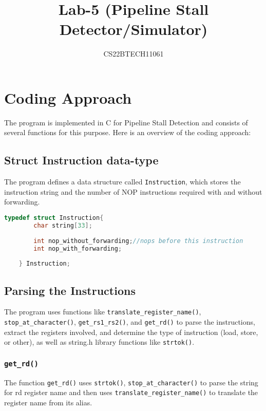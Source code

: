 \documentclass{article}
\title{Lab-5 (Pipeline Stall Detector/Simulator)}
\author{CS22BTECH11061}
\begin{document}
\maketitle

\section{Coding Approach}
The program is implemented in C for Pipeline Stall Detection and consists of several functions for this purpose. Here is an overview of the coding approach:

\subsection{Struct Instruction data-type}
The program defines a data structure called \texttt{Instruction}, which stores the instruction string and the number of NOP instructions required with and without forwarding.

\begin{lstlisting}[language=C, caption={struct Instruction}, label={code-get-rd}, backgroundcolor=\color{codebackground}]
    typedef struct Instruction{
        char string[33];
        
        int nop_without_forwarding;//nops before this instruction
        int nop_with_forwarding;
    
    } Instruction;
\end{lstlisting}

\subsection{Parsing the Instructions}
The program uses functions like \texttt{translate\_register\_name()}, \texttt{stop\_at\_character()}, \texttt{get\_rs1\_rs2()}, and \texttt{get\_rd()} to parse the instructions, extract the registers involved, and determine the type of instruction (load, store, or other), as well as string.h library functions like \texttt{strtok()}.

\subsubsection{\texttt{get\_rd()}}
The function \texttt{get\_rd()} uses \texttt{strtok()}, \texttt{stop\_at\_character()} to parse the string for rd register name and then uses \texttt{translate\_register\_name()} to translate the register name from its alias.
\end{document}
